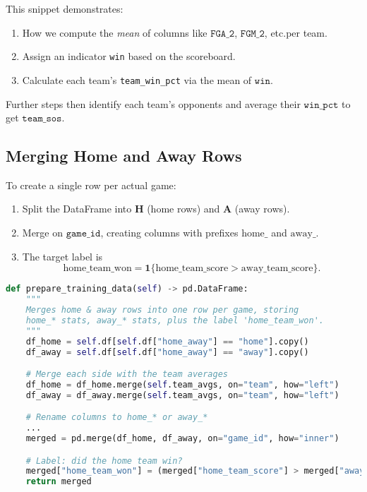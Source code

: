 \documentclass[12pt]{article}
\begin{document}
\noindent
This snippet demonstrates:
\begin{enumerate}[label=\roman*)]
    \item How we compute the \emph{mean} of columns like \(\texttt{FGA\_2}\), \(\texttt{FGM\_2}\), etc.\@ per team.
    \item Assign an indicator \texttt{win} based on the scoreboard.
    \item Calculate each team's \texttt{team\_win\_pct} via the mean of \(\texttt{win}\).
\end{enumerate}
Further steps then identify each team's opponents and average their \(\texttt{win\_pct}\) to get \(\texttt{team\_sos}\).

\subsection{Merging Home and Away Rows}
To create a single row per actual game:
\begin{enumerate}[label=\arabic*)]
    \item Split the DataFrame into \(\mathbf{H}\) (home rows) and \(\mathbf{A}\) (away rows).
    \item Merge on \(\texttt{game\_id}\), creating columns with prefixes \(\text{home\_}\) and \(\text{away\_}\).
    \item The target label is 
    \[
    \text{home\_team\_won} = \mathbf{1}\{\text{home\_team\_score} > \text{away\_team\_score}\}.
    \]
\end{enumerate}

\begin{lstlisting}[language=Python]
def prepare_training_data(self) -> pd.DataFrame:
    """
    Merges home & away rows into one row per game, storing
    home_* stats, away_* stats, plus the label 'home_team_won'.
    """
    df_home = self.df[self.df["home_away"] == "home"].copy()
    df_away = self.df[self.df["home_away"] == "away"].copy()

    # Merge each side with the team averages
    df_home = df_home.merge(self.team_avgs, on="team", how="left")
    df_away = df_away.merge(self.team_avgs, on="team", how="left")

    # Rename columns to home_* or away_*
    ...
    merged = pd.merge(df_home, df_away, on="game_id", how="inner")

    # Label: did the home team win?
    merged["home_team_won"] = (merged["home_team_score"] > merged["away_team_score"]).astype(int)
    return merged
\end{lstlisting}
\end{document}
